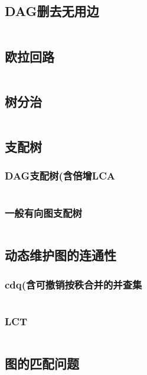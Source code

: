 \documentclass{article}
\begin{document}
\subsection{DAG删去无用边} %
\inputminted[breaklines]{c++}{../图论/DAG删去无用边.cpp} %

\subsection{欧拉回路} %
\inputminted[breaklines]{c++}{../图论/欧拉回路.cpp} %

\subsection{树分治} %
\inputminted[breaklines]{c++}{../图论/树分治.cpp} %

\subsection{支配树}
\subsubsection{DAG支配树(含倍增LCA}
\inputminted[breaklines]{c++}{../图论/DAG支配树.cpp}

\subsubsection{一般有向图支配树}
\inputminted[breaklines]{c++}{../图论/一般有向图支配树.cpp}

\subsection{动态维护图的连通性}
\subsubsection{cdq(含可撤销按秩合并的并查集}
\inputminted[breaklines]{c++}{../图论/cdq维护连通性.cpp}

\subsubsection{LCT}
\inputminted[breaklines]{c++}{../图论/LCT维护连通性.cpp}

\subsection{图的匹配问题}
\end{document}
